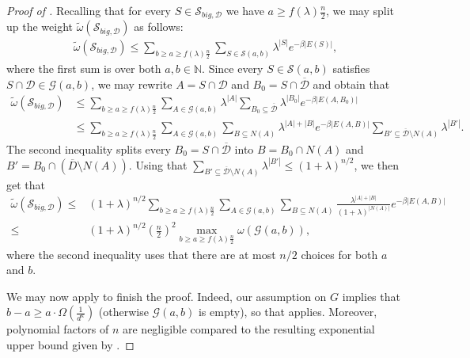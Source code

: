 \documentclass[reqno,a4paper,11pt]{amsart}
\newcommand{\cD}{\mathcal{D}}
\newcommand{\cG}{\mathcal{G}}
\newcommand{\cS}{\mathcal{S}}
\newcommand{\lam}{\lambda}
\newcommand{\ex}{\kappa}
\begin{document}
\begin{proof}[Proof of ]
Recalling that for every $S \in \cS_{big, \cD}$ we have $a \geq f(\lambda) \frac{n}{2}$, we may split up the weight $\tilde{\omega}(\cS_{big, \cD})$ as follows:
\begin{align*}
    \tilde{\omega}(\cS_{big, \cD}) \leq  \sum_{b \geq a \geq f(\lambda) \frac{n}{2}} \sum_{S \in \cS(a, b)} \lambda^{|S|} e^{- \beta |E(S)|},
\end{align*}
where the first sum is over both $a, b \in \mathbb{N}$.
Since every $S \in \cS(a, b)$ satisfies $S \cap \cD \in \cG(a, b)$, we may rewrite $A=S \cap \cD$ and $B_0= S \cap \overline{\cD}$ and obtain that
\begin{align*}
    \tilde{\omega}(\cS_{big, \cD}) &\leq \sum_{b \geq a \geq f(\lambda) \frac{n}{2}} \sum_{A \in \cG(a, b)} \lambda^{|A|} \sum_{B_0 \subseteq \overline{\cD}} \lambda^{|B_0|} e^{- \beta |E(A, B_0)|} \\
    &\leq \sum_{b \geq a \geq f(\lambda) \frac{n}{2}} \sum_{A \in \cG(a, b)} \sum_{B \subseteq N(A)} \lambda^{|A|+|B|} e^{- \beta |E(A, B)|} \sum_{B' \subseteq \overline{\cD} \setminus N(A)} \lambda^{|B'|}.
\end{align*}
The second inequality splits every $B_0 = S \cap \overline{\cD}$ into $B= B_0 \cap N(A)$ and $B' = B_0 \cap (\overline{D} \setminus N(A))$.
Using that $\sum_{B' \subseteq \overline{\cD} \setminus N(A)} \lambda^{|B'|} \leq (1+\lam)^{n/2}$, we then get that
\begin{align*}
    \tilde{\omega}(\cS_{big, \cD}) \leq & (1+\lambda)^{n/2} \sum_{b\geq a \geq f(\lambda) \frac{n}{2}} \sum_{A \in \cG(a, b)} \sum_{B \subseteq N(A)} \frac{\lambda^{|A|+|B|}}{(1+\lambda)^{|N(A)|}} e^{- \beta |E(A, B)|}\nonumber \\ 
    \leq & (1+\lambda)^{n/2} \left( \frac{n}{2} \right)^2 \max_{b\geq a \geq f(\lam) \frac{n}{2}} \omega(\cG(a, b)),
\end{align*}
where the second inequality uses that there are at most $n/2$ choices for both $a$ and $b$.

We may now apply  to finish the proof. Indeed, our assumption on $G$ implies that $b - a \geq a \cdot \Omega\left(\frac{1}{d^{\ex}}\right) $ (otherwise $\cG(a,b)$ is empty), so that  applies. Moreover, polynomial factors of $n$ are negligible compared to the resulting exponential upper bound given by .
\end{proof}
\end{document}
